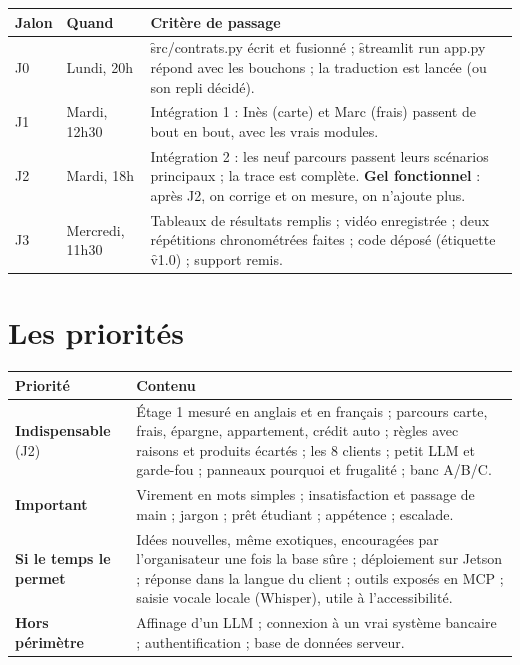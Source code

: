 \begin{center}\small
\begin{tabularx}{\textwidth}{@{}l l Y@{}}
\toprule
\textbf{Jalon} & \textbf{Quand} & \textbf{Critère de passage} \\
\midrule
J0 & Lundi, 20h & \f{src/contrats.py} écrit et fusionné ; \f{streamlit run app.py} répond avec
  les bouchons ; la traduction est lancée (ou son repli décidé). \\
J1 & Mardi, 12h30 & Intégration 1 : Inès (carte) et Marc (frais) passent de bout en bout, avec
  les vrais modules. \\
J2 & Mardi, 18h & Intégration 2 : les neuf parcours passent leurs scénarios principaux ; la trace
  est complète. \textbf{Gel fonctionnel} : après J2, on corrige et on mesure, on n'ajoute plus. \\
J3 & Mercredi, 11h30 & Tableaux de résultats remplis ; vidéo enregistrée ; deux répétitions
  chronométrées faites ; code déposé (étiquette \f{v1.0}) ; support remis. \\
\bottomrule
\end{tabularx}
\end{center}

\section{Les priorités}

\begin{center}\small
\begin{tabularx}{\textwidth}{@{}L{2.6cm} Y@{}}
\toprule
\textbf{Priorité} & \textbf{Contenu} \\
\midrule
\textbf{Indispensable} (J2) & Étage 1 mesuré en anglais et en français ; parcours carte, frais,
  épargne, appartement, crédit auto ; règles avec raisons et produits écartés ; les 8 clients ;
  petit LLM et garde-fou ; panneaux pourquoi et frugalité ; banc A/B/C. \\
\textbf{Important} & Virement en mots simples ; insatisfaction et passage de main ; jargon ; prêt
  étudiant ; appétence ; escalade. \\
\textbf{Si le temps le permet} & Idées nouvelles, même exotiques, encouragées par l'organisateur une
  fois la base sûre ; déploiement sur Jetson ; réponse dans la langue du client ;
  outils exposés en MCP ; saisie vocale locale (Whisper), utile à l'accessibilité. \\
\textbf{Hors périmètre} & Affinage d'un LLM ; connexion à un vrai système bancaire ;
  authentification ; base de données serveur. \\
\bottomrule
\end{tabularx}
\end{center}

